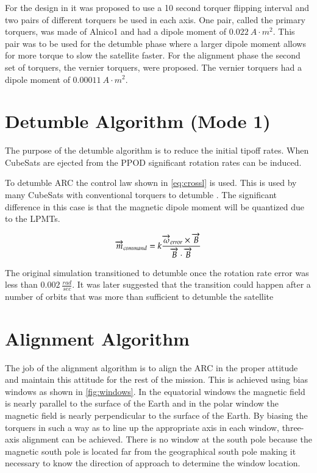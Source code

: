 For the design in \cite{Mentch11} it was proposed to use a 10 second torquer flipping interval and two pairs of different torquers be used in each axis. One pair, called the primary torquers, was made of Alnico1 and had a dipole moment of $0.022~\unit{A}{\cdot}\unit{m^2}$. This pair was to be used for the detumble phase where a larger dipole moment allows for more torque to slow the satellite faster. For the alignment phase the second set of torquers, the vernier torquers, were proposed. The vernier torquers had a dipole moment of $0.00011~\unit{A}{\cdot}\unit{m^2}$.

\section{Detumble Algorithm (Mode 1)}

The purpose of the detumble algorithm is to reduce the initial tipoff rates. When CubeSats are ejected from the \ac{PPOD} significant rotation rates can be induced.

To detumble \ac{ARC} the control law shown in \cref{eq:crossl} is used. This is used by many CubeSats with conventional torquers to detumble . The significant difference in this case is that the magnetic dipole moment will be quantized due to the \acp{LPMT}.

\begin{equation}
    \overrightarrow{m}_{command} = k {\frac{\overrightarrow{\omega}_{error} \times \overrightarrow{B}}{\overrightarrow{B} \cdot \overrightarrow{B}}}
    \label{eq:crossl}
\end{equation}

The original simulation transitioned to detumble once the rotation rate error was less than $0.002~\unit{\frac{rad}{sec}}$. It was later suggested that the transition could happen after a number of orbits that was more than sufficient to detumble the satellite

\section{Alignment Algorithm}

The job of the alignment algorithm is to align the \ac{ARC} in the proper attitude and maintain this attitude for the rest of the mission. This is achieved using bias windows as shown in \cref{fig:windows}. In the equatorial windows the magnetic field is nearly parallel to the surface of the Earth and in the polar window the magnetic field is nearly perpendicular to the surface of the Earth. By biasing the torquers in such a way as to line up the appropriate axis in each window, three-axis alignment can be achieved. There is no window at the south pole because the magnetic south pole is located far from the geographical south pole making it necessary to know the direction of approach to determine the window location.


